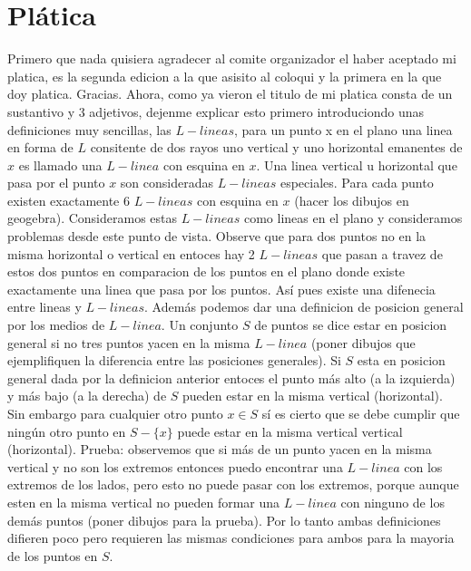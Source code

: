 \documentclass[11pt,a4paper]{article}
\begin{document}
\section{Plática}
Primero que nada quisiera agradecer al comite organizador el haber aceptado mi platica, es la segunda edicion a la que asisito al coloqui y la primera en la que doy platica. Gracias.
Ahora, como ya vieron el titulo de mi platica consta de un sustantivo y 3 adjetivos, dejenme explicar esto primero introduciondo unas definiciones muy sencillas, las $L-lineas$, para un punto x en el plano una linea en forma de $L$ consitente de dos rayos uno vertical y uno horizontal emanentes de $x$ es llamado una $L-linea$ con esquina en $x$. Una linea vertical u horizontal que pasa por el punto $x$ son consideradas $L-lineas$ especiales. Para cada punto existen exactamente 6 $L-lineas$ con esquina en $x$ (hacer los dibujos en geogebra). Consideramos estas $L-lineas$ como lineas en el plano y consideramos problemas desde este punto de vista. Observe que para dos puntos no en la misma horizontal o vertical en entoces hay 2 $L-lineas$ que pasan a travez de estos dos puntos en comparacion de los puntos en el plano donde existe exactamente una linea que pasa por los puntos. Así pues existe una difenecia entre lineas y $L-lineas$.  Además podemos dar una definicion de posicion general por los medios de $L-linea$. Un conjunto $S$ de puntos se dice estar en posicion general si no tres puntos yacen en la misma $L-linea$ (poner dibujos que ejemplifiquen la diferencia entre las posiciones generales). Si $S$ esta en posicion general dada por la definicion anterior entoces el punto más alto (a la izquierda) y más bajo (a la derecha) de $S$ pueden estar en la misma vertical (horizontal). Sin embargo para cualquier otro punto $x \in S$ sí es cierto que se debe cumplir que ningún otro punto  en $S-\lbrace x \rbrace$ puede estar en la misma vertical vertical (horizontal). Prueba: observemos que si más de un punto yacen en la misma vertical y no son los extremos entonces puedo encontrar una $L-linea$ con los extremos de los lados, pero esto no puede pasar con los extremos, porque aunque esten en la misma vertical no pueden formar una $L-linea$ con ninguno de los demás puntos (poner dibujos para la prueba). Por lo tanto ambas definiciones difieren poco pero requieren las mismas condiciones para ambos para la mayoria de los puntos en $S$. 
\end{document}
